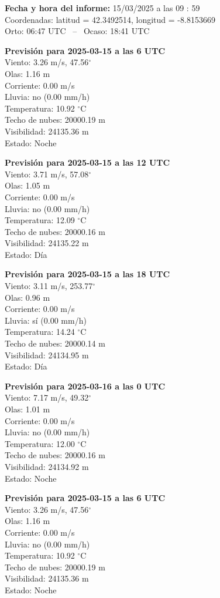 {\bf Fecha y hora del informe:} 15/03/2025 a las 09 : 59\\
Coordenadas: latitud = 42.3492514, longitud = -8.8153669\\
Orto: 06:47 UTC \, -- \, Ocaso: 18:41 UTC

{\bf Previsión para 2025-03-15 a las 6 UTC}\\
  Viento: 3.26 m/s, 47.56$^\circ$\\
  Olas: 1.16 m\\
  Corriente: 0.00 m/s\\
  Lluvia: no (0.00 mm/h)\\
  Temperatura: 10.92 $^\circ$C\\
  Techo de nubes: 20000.19 m\\
  Visibilidad: 24135.36 m\\
  Estado: Noche

{\bf Previsión para 2025-03-15 a las 12 UTC}\\
  Viento: 3.71 m/s, 57.08$^\circ$\\
  Olas: 1.05 m\\
  Corriente: 0.00 m/s\\
  Lluvia: no (0.00 mm/h)\\
  Temperatura: 12.09 $^\circ$C\\
  Techo de nubes: 20000.16 m\\
  Visibilidad: 24135.22 m\\
  Estado: Día

{\bf Previsión para 2025-03-15 a las 18 UTC}\\
  Viento: 3.11 m/s, 253.77$^\circ$\\
  Olas: 0.96 m\\
  Corriente: 0.00 m/s\\
  Lluvia: sí (0.00 mm/h)\\
  Temperatura: 14.24 $^\circ$C\\
  Techo de nubes: 20000.14 m\\
  Visibilidad: 24134.95 m\\
  Estado: Día

{\bf Previsión para 2025-03-16 a las 0 UTC}\\
  Viento: 7.17 m/s, 49.32$^\circ$\\
  Olas: 1.01 m\\
  Corriente: 0.00 m/s\\
  Lluvia: no (0.00 mm/h)\\
  Temperatura: 12.00 $^\circ$C\\
  Techo de nubes: 20000.16 m\\
  Visibilidad: 24134.92 m\\
  Estado: Noche

{\bf Previsión para 2025-03-15 a las 6 UTC}\\
  Viento: 3.26 m/s, 47.56$^\circ$\\
  Olas: 1.16 m\\
  Corriente: 0.00 m/s\\
  Lluvia: no (0.00 mm/h)\\
  Temperatura: 10.92 $^\circ$C\\
  Techo de nubes: 20000.19 m\\
  Visibilidad: 24135.36 m\\
  Estado: Noche

